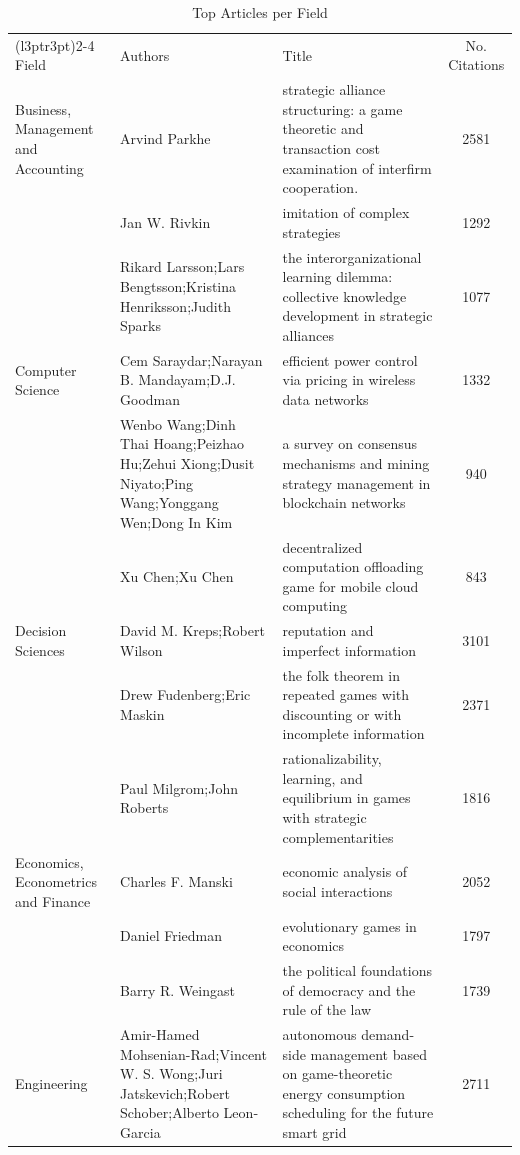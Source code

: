 \documentclass[
  12pt,
]{article}
\begin{document}
\begin{longtable}[t]{>{\raggedright\arraybackslash}p{4cm}>{\raggedright\arraybackslash}p{4cm}>{\raggedright\arraybackslash}p{4cm}c}
\caption{\label{tab:top_articles_per_field}Top Articles per Field}\\
\toprule
\multicolumn{1}{c}{ } & \multicolumn{3}{c}{Top Articles per Field (Descending Order)} \\
\cmidrule(l{3pt}r{3pt}){2-4}
Field & Authors & Title & No. Citations\\
\midrule
Business, Management and Accounting & Arvind Parkhe & strategic alliance structuring: a game theoretic and transaction cost examination of interfirm cooperation. & 2581\\
 & Jan W. Rivkin & imitation of complex strategies & 1292\\
 & Rikard Larsson;Lars Bengtsson;Kristina Henriksson;Judith Sparks & the interorganizational learning dilemma: collective knowledge development in strategic alliances & 1077\\
Computer Science & Cem Saraydar;Narayan B. Mandayam;D.J. Goodman & efficient power control via pricing in wireless data networks & 1332\\
 & Wenbo Wang;Dinh Thai Hoang;Peizhao Hu;Zehui Xiong;Dusit Niyato;Ping Wang;Yonggang Wen;Dong In Kim & a survey on consensus mechanisms and mining strategy management in blockchain networks & 940\\
 & Xu Chen;Xu Chen & decentralized computation offloading game for mobile cloud computing & 843\\
Decision Sciences & David M. Kreps;Robert Wilson & reputation and imperfect information & 3101\\
 & Drew Fudenberg;Eric Maskin & the folk theorem in repeated games with discounting or with incomplete information & 2371\\
 & Paul Milgrom;John Roberts & rationalizability, learning, and equilibrium in games with strategic complementarities & 1816\\
Economics, Econometrics and Finance & Charles F. Manski & economic analysis of social interactions & 2052\\
 & Daniel Friedman & evolutionary games in economics & 1797\\
 & Barry R. Weingast & the political foundations of democracy and the rule of the law & 1739\\
Engineering & Amir-Hamed Mohsenian-Rad;Vincent W. S. Wong;Juri Jatskevich;Robert Schober;Alberto Leon‐Garcia & autonomous demand-side management based on game-theoretic energy consumption scheduling for the future smart grid & 2711\\

\end{longtable}
\end{document}
